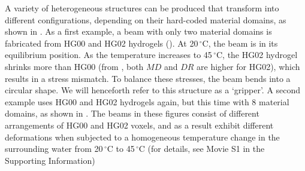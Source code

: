 A variety of heterogeneous structures can be produced that transform into different configurations, depending on their hard-coded material domains, as shown in . 
As a first example, a beam with only two material domains is fabricated from HG00 and HG02 hydrogels (). 
At 20\,$^{\circ}$C, the beam is in its equilibrium position. As the temperature increases to 45\,$^{\circ}$C, the HG02 hydrogel shrinks more than HG00 (from , both $MD$ and $DR$ are higher for HG02), 
which results in a stress mismatch. To balance these stresses, the beam bends into a circular shape. 
We will henceforth refer to this structure as a `gripper'. %
A second example uses HG00 and HG02 hydrogels again, but this time with 
8 material domains, as shown in . The beams in these figures consist of different arrangements of HG00 and HG02 voxels, and as a result exhibit different deformations when subjected to a homogeneous temperature change in the surrounding water from 20\,$^{\circ}$C to 45\,$^{\circ}$C (for details, see Movie S1 in the Supporting Information)\\

